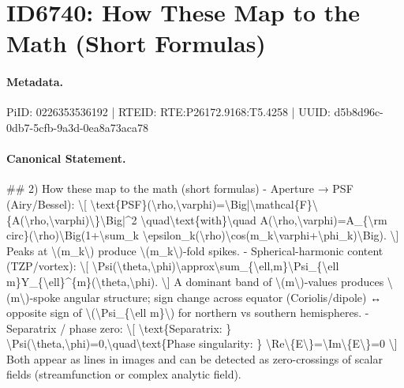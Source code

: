 \section*{ID6740: How These Map to the Math (Short Formulas)}
\paragraph{Metadata.}
PiID: 0226353536192 | RTEID: RTE:P26172.9168:T5.4258 | UUID: d5b8d96c-0db7-5cfb-9a3d-0ea8a73aca78

\paragraph{Canonical Statement.}
\#\# 2) How these map to the math (short formulas) - Aperture → PSF (Airy/Bessel): \textbackslash{}[ \textbackslash{}text\{PSF\}(\textbackslash{}rho,\textbackslash{}varphi)=\textbackslash{}Big|\textbackslash{}mathcal\{F\}\textbackslash{}\{A(\textbackslash{}rho,\textbackslash{}varphi)\textbackslash{}\}\textbackslash{}Big|\textasciicircum{}2 \textbackslash{}quad\textbackslash{}text\{with\}\textbackslash{}quad A(\textbackslash{}rho,\textbackslash{}varphi)=A\_\{\textbackslash{}rm circ\}(\textbackslash{}rho)\textbackslash{}Big(1+\textbackslash{}sum\_k \textbackslash{}epsilon\_k(\textbackslash{}rho)\textbackslash{}cos(m\_k\textbackslash{}varphi+\textbackslash{}phi\_k)\textbackslash{}Big). \textbackslash{}] Peaks at \textbackslash{}(m\_k\textbackslash{}) produce \textbackslash{}(m\_k\textbackslash{})-fold spikes. - Spherical-harmonic content (TZP/vortex): \textbackslash{}[ \textbackslash{}Psi(\textbackslash{}theta,\textbackslash{}phi)\textbackslash{}approx\textbackslash{}sum\_\{\textbackslash{}ell,m\}\textbackslash{}Psi\_\{\textbackslash{}ell m\}Y\_\{\textbackslash{}ell\}\textasciicircum{}\{m\}(\textbackslash{}theta,\textbackslash{}phi). \textbackslash{}] A dominant band of \textbackslash{}(m\textbackslash{})-values produces \textbackslash{}(m\textbackslash{})-spoke angular structure; sign change across equator (Coriolis/dipole) ↔ opposite sign of \textbackslash{}(\textbackslash{}Psi\_\{\textbackslash{}ell m\}\textbackslash{}) for northern vs southern hemispheres. - Separatrix / phase zero: \textbackslash{}[ \textbackslash{}text\{Separatrix: \} \textbackslash{}Psi(\textbackslash{}theta,\textbackslash{}phi)=0,\textbackslash{}quad\textbackslash{}text\{Phase singularity: \} \textbackslash{}Re\textbackslash{}\{E\textbackslash{}\}=\textbackslash{}Im\textbackslash{}\{E\textbackslash{}\}=0 \textbackslash{}] Both appear as lines in images and can be detected as zero-crossings of scalar fields (streamfunction or complex analytic field).

